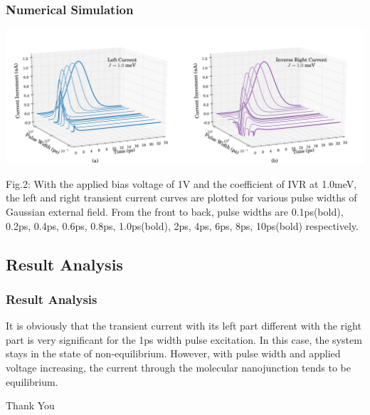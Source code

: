\documentclass{beamer}
\begin{document}
\begin{frame}
\frametitle{Numerical Simulation}
\includegraphics[scale=0.05]{F2.png}
\par Fig.2: With the applied bias voltage of 1V and the coefficient of IVR at 1.0meV, the left and right transient current curves are plotted for various pulse widths of Gaussian external field. From the front to back, pulse widths are 0.1ps(bold), 0.2ps, 0.4ps, 0.6ps, 0.8ps, 1.0ps(bold), 2ps, 4ps, 6ps, 8ps, 10ps(bold) respectively. 
\end{frame}

    \subsection{Result Analysis}

\begin{frame}
\frametitle{Result Analysis}
It is obviously that the transient current with its left part different with the right part is very significant for the 1ps width pulse excitation. In this case, the system stays in the state of non-equilibrium. However, with pulse width and applied voltage increasing, the current through the molecular nanojunction tends to be equilibrium.
\end{frame}

\begin{frame}
\Huge{\centerline{Thank You}}
\end{frame}
\end{document}
